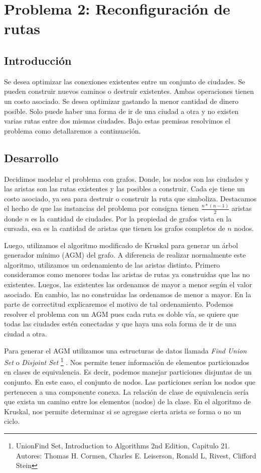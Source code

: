 \section{Problema 2: Reconfiguraci\'on de rutas}

\subsection{Introducci\'on}

\quad Se desea optimizar las conexiones existentes entre un conjunto de ciudades. Se pueden construir nuevos caminos o destruir existentes. Ambas operaciones tienen un costo asociado. Se desea optimizar gastando la menor cantidad de dinero posible. Solo puede haber una forma de ir de una ciudad a otra y no existen varias rutas entre dos mismas ciudades. Bajo estas premisas resolvimos el problema como detallaremos a continuación.


\subsection{Desarrollo}

\quad Decidimos modelar el problema con grafos. Donde, los nodos son las ciudades y las aristas son las rutas existentes y las posibles a construir. Cada eje tiene un costo asociado, ya sea para destruir o construir la ruta que simboliza. Destacamos el hecho de que las instancias del problema por consigna tienen $ \frac{n * (n - 1)}{2} $ aristas donde $ n $ es la cantidad de ciudades. Por la propiedad de grafos vista en la cursada, esa es la cantidad de aristas que tienen los grafos completos de $ n $ nodos.

\quad

\quad Luego, utilizamos el algoritmo modificado de Kruskal para generar un \'arbol generador m\'inimo (AGM) del grafo. A diferencia de realizar normalmente este algoritmo, utilizamos un ordenamiento de las aristas distinto. Primero consideramos como menores todas las aristas de rutas ya construidas que las no existentes. Luegos, las existentes las ordenamos de mayor a menor según el valor asociado. En cambio, las no construidas las ordenamos de menor a mayor. En la parte de correctitud explicaremos el motivo de tal ordenamiento. Podemos resolver el problema con un AGM pues cada ruta es doble vía, se quiere que todas las ciudades est\'en conectadas y que haya una sola forma de ir de una ciudad a otra.

\quad Para generar el AGM utilizamos una estructuras de datos llamada \textit{Find Union Set} o \textit{Disjoint Set} \footnote{UnionFind Set, Introduction to Algorithms 2nd Edition, Capitulo 21. Autores: Thomas H. Cormen, Charles E. Leiserson, Ronald L, Rivest, Clifford Stein} . Nos permite tener informaci\'on de elementos particionados en clases de equivalencia. Es decir, podemos manejar particiones disjuntas de un conjunto. En este caso, el conjunto de nodos. Las particiones ser\'ian los nodos que pertenecen a una componente conexa. La relaci\'on de clase de equivalencia ser\'ia que exista un camino entre los elementos (nodos) de la clase. En el algoritmo de Kruskal, nos permite determinar si se agregase cierta arista se forma o no un ciclo.

